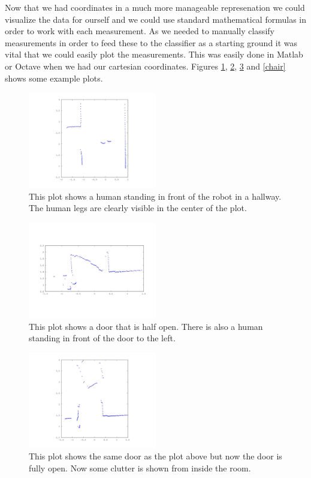 \documentclass[a4paper, 10pt, conference]{ieeeconf}      %
\begin{document}
Now that we had coordinates in a much more manageable represenation we could visualize the data for ourself and we could use standard mathematical formulas in order to work with each measurement. As we needed to manually classify measurements in order to feed these to the classifier as a starting ground it was vital that we could easily plot the measurements. This was easily done in Matlab or Octave when we had our cartesian coordinates. Figures \ref{human}, \ref{doorhalf}, \ref{doorfull} and \ref{chair} shows some example plots.


\begin{figure}
\centering
\includegraphics[width=0.5\textwidth]{presimg/human.jpg}
\caption{This plot shows a human standing in front of the robot in a hallway. The human legs are clearly visible in the center of the plot.}
\label{human}
\end{figure}

\begin{figure}
\centering
\includegraphics[width=0.5\textwidth]{presimg/doorhalf.jpg}
\caption{This plot shows a door that is half open. There is also a human standing in front of the door to the left.}
\label{doorhalf}
\end{figure}

\begin{figure}
\centering
\includegraphics[width=0.5\textwidth]{presimg/doorfull.jpg}
\caption{This plot shows the same door as the plot above but now the door is fully open. Now some clutter is shown from inside the room.}
\label{doorfull}
\end{figure}
\end{document}
